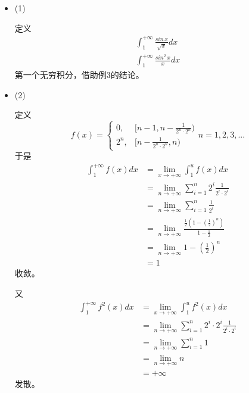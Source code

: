 \documentclass{article}
\begin{document}
\begin{itemize}
  \item (1)

        定义
        \begin{align*}
          \int_{1}^{+\infty} \frac{sin\, x}{\sqrt{x}} dx \\
          \int_{1}^{+\infty} \frac{sin^2\, x}{x} dx
        \end{align*}
        第一个无穷积分，借助例3的结论。

  \item (2)

        定义
        \begin{equation*}
          f(x) =
          \begin{cases}
            0,   & [n - 1, n -  \frac{1}{2^n \cdot 2^n}) \\
            2^n, & [n - \frac{1}{2^n \cdot 2^n}, n)
          \end{cases}
          n = 1, 2, 3, ...
        \end{equation*}
        于是
        \begin{align*}
          \int_{1}^{+\infty} f(x) dx
           & = \lim\limits_{x \to +\infty} \int_{1}^{u} f(x) dx                                     \\
           & = \lim\limits_{n \to +\infty} \sum\limits_{i = 1}^n 2^i \frac{1}{2^i \cdot 2^i}        \\
           & = \lim\limits_{n \to +\infty} \sum\limits_{i = 1}^n \frac{1}{2^i}                      \\
           & = \lim\limits_{n \to +\infty} \frac{\frac{1}{2}(1 - (\frac{1}{2})^n)}{1 - \frac{1}{2}} \\
           & = \lim\limits_{n \to +\infty} 1 - (\frac{1}{2})^n                                      \\
           & = 1
        \end{align*}
        收敛。

        又
        \begin{align*}
          \int_{1}^{+\infty} f^2(x) dx
           & = \lim\limits_{x \to +\infty} \int_{1}^{u} f^2(x) dx                                      \\
           & = \lim\limits_{n \to +\infty} \sum\limits_{i = 1}^n 2^i \cdot 2^i \frac{1}{2^i \cdot 2^i} \\
           & = \lim\limits_{n \to +\infty} \sum\limits_{i = 1}^n 1                                     \\
           & = \lim\limits_{n \to +\infty} n                                                           \\
           & = + \infty
        \end{align*}
        发散。
\end{itemize}
\end{document}
